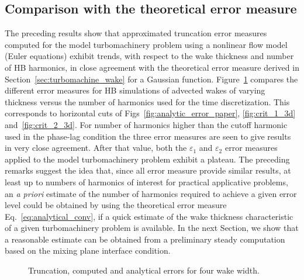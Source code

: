 \subsection{Comparison with the theoretical error measure}
\label{sub:comp_w_analytic}


The preceding results show that approximated truncation error 
measures computed for the model turbomachinery problem 
using a nonlinear flow model (Euler equations) 
exhibit trends, with respect to the wake thickness 
and number of HB harmonics, in close agreement with the 
theoretical error measure derived in Section~\ref{sec:turbomachine_wake} 
for a Gaussian function. 
Figure~\ref{fig:error_comp_curves} compares the 
different error measures for HB simulations of 
advected wakes of varying thickness versus 
the number of harmonics used for the time discretization. 
This corresponds to horizontal cuts of Figs~\ref{fig:analytic_error_paper}, 
\ref{fig:crit_1_3d} and~\ref{fig:crit_2_3d}. 
For number of harmonics higher than the cutoff 
harmonic used in the phase-lag condition 
the three error measures are seen to give 
results in very close agreement. After that value, 
both the $\varepsilon_1$ and $\varepsilon_2$ error 
measures applied to the model turbomachinery problem 
exhibit a plateau.
The preceding remarks suggest the idea that, 
since all error measure provide similar results, 
at least up to numbers of harmonics of interest for 
practical applicative problems, an \emph{a priori} 
estimate of the number of harmonics required 
to achieve a given error level could be 
obtained by using the theoretical error measure 
Eq.~\eqref{eq:analytical_conv}, if a quick 
estimate of the wake thickness characteristic 
of a given turbomachinery problem is available. 
In the next Section, we show that a reasonable 
estimate can be obtained from a preliminary steady 
computation based on the mixing plane interface condition.
\begin{figure}[htp]
  \centering
  \quad
  \quad
  \quad
  \quad
  \caption{Truncation, computed and analytical errors for four wake width.}
  \label{fig:error_comp_curves}
\end{figure}

